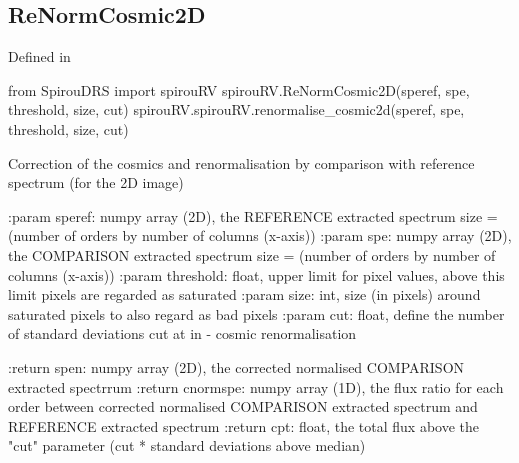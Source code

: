 \noindent\begin{minipage}{\textwidth}
\subsection{ReNormCosmic2D}

Defined in \spirouRV{}

\begin{pythonbox}
from SpirouDRS import spirouRV
spirouRV.ReNormCosmic2D(speref, spe, threshold, size, cut)
spirouRV.spirouRV.renormalise_cosmic2d(speref, spe, threshold, size, cut)
\end{pythonbox}

\begin{pythondocstring}
Correction of the cosmics and renormalisation by comparison with
reference spectrum (for the 2D image)

:param speref: numpy array (2D), the REFERENCE extracted spectrum
               size = (number of orders by number of columns (x-axis))
:param spe:  numpy array (2D), the COMPARISON extracted spectrum
             size = (number of orders by number of columns (x-axis))
:param threshold: float, upper limit for pixel values, above this limit
                  pixels are regarded as saturated
:param size: int, size (in pixels) around saturated pixels to also regard
             as bad pixels
:param cut: float, define the number of standard deviations cut at in             -                  cosmic renormalisation

:return spen: numpy array (2D), the corrected normalised COMPARISON
              extracted spectrrum
:return cnormspe: numpy array (1D), the flux ratio for each order between
                  corrected normalised COMPARISON extracted spectrum and
                  REFERENCE extracted spectrum
:return cpt: float, the total flux above the "cut" parameter
             (cut * standard deviations above median)
\end{pythondocstring}
\end{minipage}


